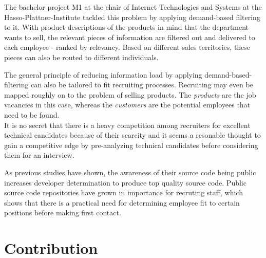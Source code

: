 The bachelor project M1 at the chair of Internet Technologies and Systems
at the Hasso-Plattner-Institute tackled this problem by applying demand-based filtering to it.
With product descriptions of the products in mind that the department wants to sell,
the relevant pieces of information are filtered out and delivered to each employee -
ranked by relevancy. Based on different sales territories,
these pieces can also be routed to different individuals.
\newline


The general principle of reducing information load by applying
demand-based-filtering can also be tailored to fit recruiting processes.
Recruiting may even be mapped roughly on to the problem of selling products.
The \textit{products} are the job vacancies in this case, whereas the
\textit{customers} are the potential employees that need to be found.\\
It is no secret that there is a heavy competition among recruiters for excellent
technical candidates because of their scarcity and it seems a resonable thought
to gain a competitive edge by pre-analyzing technical candidates
before considering them for an interview.
\newline

As previous studies have shown, the awareness of their source
code being public increases developer determination
to produce top quality source code\cite{md:2013}.
Public source code repositories have grown in importance for recruting
staff, which shows that there is a practical need for determining
employee fit to certain positions before making first contact.

\section{Contribution}

